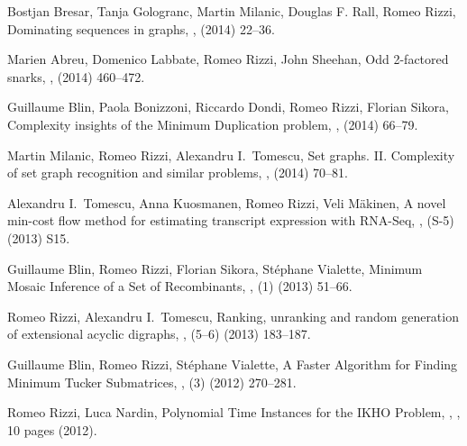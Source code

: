 \begin{etaremune}
  \item {\sc Bostjan Bresar, Tanja Gologranc, Martin Milanic, Douglas F. Rall, Romeo Rizzi},
   \newblock  Dominating sequences in graphs,
   ,
    (2014) 22--36.

  \item {\sc Marien Abreu, Domenico Labbate, Romeo Rizzi, John Sheehan},
   \newblock  Odd 2-factored snarks,
   ,
    (2014) 460--472.

  \item {\sc Guillaume Blin, Paola Bonizzoni, Riccardo Dondi, Romeo Rizzi, Florian Sikora},
   \newblock  Complexity insights of the Minimum Duplication problem,
   ,
    (2014) 66--79.

  \item {\sc Martin Milanic, Romeo Rizzi, Alexandru I.~Tomescu},
   \newblock  Set graphs. II. Complexity of set graph recognition and similar problems,
   ,
    (2014) 70--81. 

  \item {\sc Alexandru I.~Tomescu, Anna Kuosmanen, Romeo Rizzi, Veli M\"akinen},
   \newblock  A novel min-cost flow method for estimating transcript expression with RNA-Seq,
   ,
   (S-5) (2013) S15. 

  \item {\sc Guillaume Blin, Romeo Rizzi, Florian Sikora, St\'ephane Vialette},
   \newblock  Minimum Mosaic Inference of a Set of Recombinants,
   ,
   (1) (2013) 51--66.

  \item {\sc Romeo Rizzi, Alexandru I.~Tomescu},
   \newblock  Ranking, unranking and random generation of extensional acyclic digraphs,
   ,
   (5--6) (2013) 183--187. 

  \item {\sc Guillaume Blin, Romeo Rizzi, St\'ephane Vialette},
   \newblock  A Faster Algorithm for Finding Minimum Tucker Submatrices,
   ,
   (3) (2012) 270--281.

  \item {\sc Romeo Rizzi, Luca Nardin},
   \newblock  Polynomial Time Instances for the IKHO Problem,
   ,
   , 10 pages (2012).


\end{etaremune}
